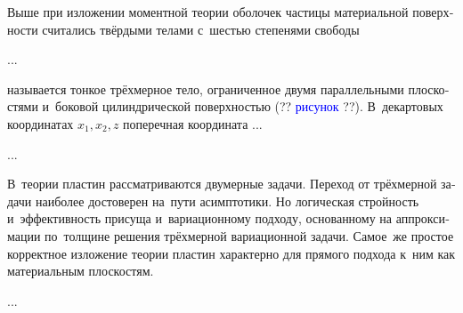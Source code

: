 \begin{otherlanguage}{russian}


\noindent Выше при изложении моментной теории оболочек частицы материальной поверхности считались твёрдыми телами с~шестью степенями свободы

...



\end{otherlanguage}



\label{section:overviewofplates}

\begin{otherlanguage}{russian}

 называется тонкое трёхмерное тело, ограниченное двумя параллельными плоскостями и~боковой цилиндрической поверхностью (?? \textcolor{blue}{рисунок} ??).
В~декартовых координатах ${x_1, x_2, z}$ поперечная координата ...

...

В~теории пластин рассматриваются двумерные задачи.
Переход от трёхмерной задачи наиболее достоверен на~пути асимптотики.
Но логическая стройность и~эффективность присуща и~вариационному подходу, основанному на аппроксимации по~толщине решения трёхмерной вариационной задачи.
Самое~же простое корректное изложение теории пластин характерно для прямого подхода к~ним как материальным плоскостям.

...



\end{otherlanguage}



